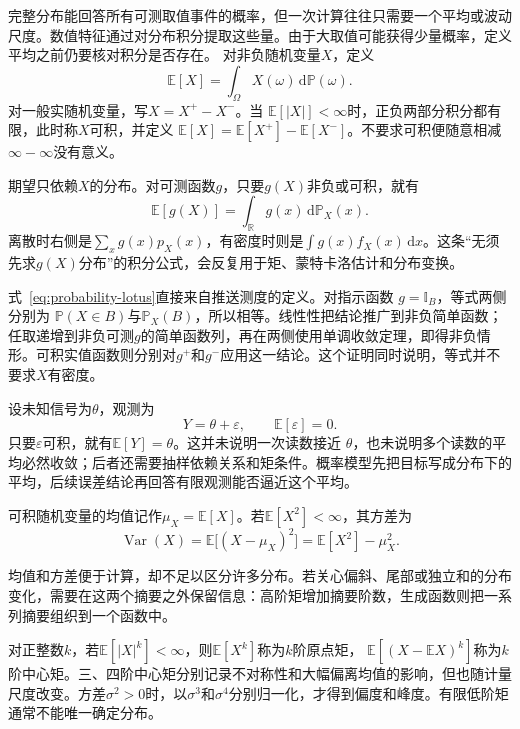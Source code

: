 完整分布能回答所有可测取值事件的概率，但一次计算往往只需要一个平均或波动尺度。数值特征通过对分布积分提取这些量。由于大取值可能获得少量概率，定义平均之前仍要核对积分是否存在。
\label{sec:probability-expectation-conditional-expectation}
\label{sec:probability-moment-transforms}
对非负随机变量\(X\)，定义
\[ \mathbb{E}[X]
  =\int_{\Omega}X(\omega)\,\mathrm{d}\mathbb{P}(\omega). \]
对一般实随机变量，写\(X=X^+-X^-\)。当
\(\mathbb{E}[|X|]<\infty\)时，正负两部分积分都有限，此时称\(X\)可积，并定义
\(\mathbb{E}[X]=\mathbb{E}[X^+]-\mathbb{E}[X^-]\)。不要求可积便随意相减\(\infty-\infty\)没有意义。

期望只依赖\(X\)的分布。对可测函数\(g\)，只要\(g(X)\)非负或可积，就有
\begin{equation}
  \mathbb{E}[g(X)]
  =
  \int_{\mathbb{R}}g(x)\,\mathrm{d}\mathbb{P}_X(x).
  \label{eq:probability-lotus}
\end{equation}
离散时右侧是\(\sum_x g(x)p_X(x)\)，有密度时则是\(\int g(x)f_X(x)\,\mathrm{d}x\)。这条“无须先求\(g(X)\)分布”的积分公式，会反复用于矩、蒙特卡洛估计和分布变换。

式~\eqref{eq:probability-lotus}直接来自推送测度的定义。对指示函数
\(g=\mathbb{I}_B\)，等式两侧分别为
\(\mathbb{P}(X\in B)\)与\(\mathbb{P}_X(B)\)，所以相等。线性性把结论推广到非负简单函数；任取递增到非负可测\(g\)的简单函数列，再在两侧使用单调收敛定理，即得非负情形。可积实值函数则分别对\(g^+\)和\(g^-\)应用这一结论。这个证明同时说明，等式并不要求\(X\)有密度。

\begin{example}[带噪观测的平均目标]
\label{ex:probability-noisy-observation}
设未知信号为\(\theta\)，观测为
\[ Y=\theta+\varepsilon,
  \qquad\mathbb{E}[\varepsilon]=0. \]
只要\(\varepsilon\)可积，就有\(\mathbb{E}[Y]=\theta\)。这并未说明一次读数接近
\(\theta\)，也未说明多个读数的平均必然收敛；后者还需要抽样依赖关系和矩条件。概率模型先把目标写成分布下的平均，后续误差结论再回答有限观测能否逼近这个平均。
\end{example}
可积随机变量的均值记作\(\mu_X=\mathbb{E}[X]\)。若\(\mathbb{E}[X^2]<\infty\)，其方差为
\[ \operatorname{Var}(X)
  =\mathbb{E}\bigl[(X-\mu_X)^2\bigr]=\mathbb{E}[X^2]-\mu_X^2. \]

均值和方差便于计算，却不足以区分许多分布。若关心偏斜、尾部或独立和的分布变化，需要在这两个摘要之外保留信息：高阶矩增加摘要阶数，生成函数则把一系列摘要组织到一个函数中。

对正整数\(k\)，若\(\mathbb{E}[|X|^k]<\infty\)，则\(\mathbb{E}[X^k]\)称为\(k\)阶原点矩，
\(\mathbb{E}[(X-\mathbb{E}X)^k]\)称为\(k\)阶中心矩。三、四阶中心矩分别记录不对称性和大幅偏离均值的影响，但也随计量尺度改变。方差\(\sigma^2>0\)时，以\(\sigma^3\)和\(\sigma^4\)分别归一化，才得到偏度和峰度。有限低阶矩通常不能唯一确定分布。

